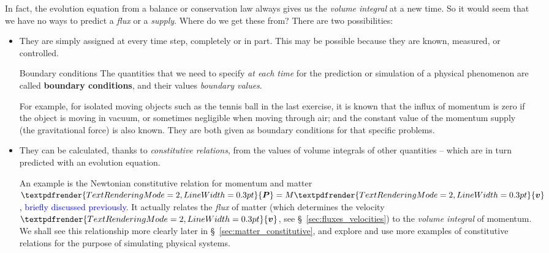 \documentclass[a4paper,12pt,%
onecolumn,oneside,titlepage,%
british%
]{memoir}
\renewcommand*{\bm}[1]{\textpdfrender{TextRenderingMode=2,LineWidth=0.3pt}{\boldsymbol{#1}}}
\renewcommand*{\|}[1][]{\nonscript\:#1\vert\nonscript\:\mathopen{}}
\newcommand*{\sect}{\S}%
\renewcommand*{\autoref}[2]{\sidepar{\vspace{-1ex}\footnotesize{\color{blue}\faIcon{hand-point-right}\enspace\sect\,\ref{#1} p.\,\pageref{#1}}}\textcolor{blue}{#2}}
\newcommand*{\yv}{\bm{v}}
\newcommand*{\yM}{M}%
\newcommand*{\yP}{\bm{P}}
\begin{document}
In fact, the evolution equation from a balance or conservation law always gives us the \emph{volume integral} at a new time. So it would seem that we have no ways to predict a \emph{flux} or a \emph{supply}. Where do we get these from? There are two possibilities:
\begin{itemize}[para]
\item They are simply assigned at every time step, completely or in part. This may be possible because they are known, measured, or controlled.
  \begin{definition}{Boundary conditions}
    The quantities that we need to specify \emph{at each time} for the prediction or simulation of a physical phenomenon are called \textbf{boundary conditions}, and their values \emph{boundary values}.
  \end{definition}

  For example, for isolated moving objects such as the tennis ball in the last exercise, it is known that the influx of momentum is zero if the object is moving in vacuum, or sometimes negligible when moving through air; and the constant value of the momentum supply (the gravitational force) is also known. They are both given as boundary conditions for that specific problems.

\item They can be calculated, thanks to \emph{constitutive relations}, from the values of volume integrals of other quantities -- which are in turn predicted with an evolution equation.

  An example is the Newtonian constitutive relation for momentum and matter $\yP = \yM\yv$, \autoref{item:momentum_mass_velocity}{briefly discussed previously}. It actually relates the \emph{flux} of matter (which determines the velocity $\yv$, see \sect~\ref{sec:fluxes_velocities}) to the \emph{volume integral} of momentum. We shall see this relationship more clearly later in \sect~\ref{sec:matter_constitutive}, and explore and use more examples of constitutive relations for the purpose of simulating physical systems.
\end{itemize}
\end{document}
